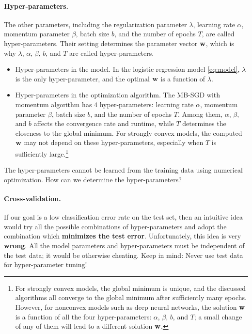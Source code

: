 \documentclass[11pt]{article}
\numberwithin{equation}{section}
\def\w{{\bf w}}
\begin{document}
\paragraph{Hyper-parameters.}
The other parameters, including the regularization parameter $\lambda$, learning rate $\alpha$, momentum parameter $\beta$, batch size $b$, and the number of epochs $T$, are called hyper-parameters.
Their setting determines the parameter vector $\w$, which is why $\lambda$, $\alpha$, $\beta$, $b$, and $T$ are called hyper-parameters.
\begin{itemize}
	\item 
	Hyper-parameters in the model.
	In the logistic regression model \eqref{eq:model},
	$\lambda$ is the only hyper-parameter,
	and the optimal $\w$ is a function of $\lambda$.
	\item
	Hyper-parameters in the optimization algorithm.
	The MB-SGD with momentum algorithm has 4 hyper-parameters:
	learning rate $\alpha$, momentum parameter $\beta$, batch size $b$, and the number of epochs $T$.
	Among them, $\alpha$, $\beta$, and $b$ affects the convergence rate and runtime, 
	while $T$ determines the closeness to the global minimum.
	For strongly convex models, the computed $\w$ may not depend on these hyper-parameters, especially when $T$ is sufficiently large.\footnote{For strongly convex models, the global minimum is unique, and the discussed algorithms all converge to the global minimum after sufficiently many epochs.
		However, for nonconvex models such as deep neural networks, the solution $\w$ is a function of all the four hyper-parameters: $\alpha$, $\beta$, $b$, and $T$; a small change of any of them will lead to a different solution $\w$.}
\end{itemize}
The hyper-parameters cannot be learned from the training data using numerical optimization.
How can we determine the hyper-parameters?




\paragraph{Cross-validation.}
If our goal is a low classification error rate on the test set, 
then an intuitive idea would try all the possible combinations of hyper-parameters and adopt the combination which {\bf minimizes the test error}.
Unfortunately, this idea is very \textbf{wrong}.
All the model parameters and hyper-parameters must be independent of the test data; it would be otherwise cheating.
Keep in mind: Never use test data for hyper-parameter tuning!
\end{document}

